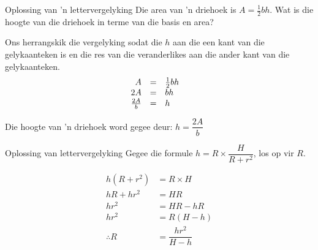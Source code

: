 
\begin{wex}
{Oplossing van 'n lettervergelyking}
{
Die area van ’n driehoek is $A=\frac{1}{2}bh$. Wat is die hoogte van die driehoek in terme van die basis en area?
}
{
Ons herrangskik die vergelyking sodat die $h$ aan die een kant
van die gelykaanteken is en die res van die veranderlikes aan die
ander kant van die gelykaanteken.
\begin{equation*}
    \begin{array}{cccc}\hfill A& =& \frac{1}{2}bh\hfill & \\
	\hfill 2A& =& bh\hfill & \hfill \\
	\hfill \frac{2A}{b}& =& h\hfill 
    \end{array}
\end{equation*}

Die hoogte van ’n driehoek word gegee deur: $h=\dfrac{2A}{b}$
} 
\end{wex}

\begin{wex}
{Oplossing van lettervergelyking}
{
Gegee die formule $h=  R\times \dfrac{H}{R+r^2}$, los op vir $R$.
}
{
\begin{align*}
  h(R+r^2) &= R \times H \\
  hR + hr^2 &= HR \\
  hr^2 &= HR - hR \\
  hr^2 &= R(H - h) \\
  \therefore R &= \dfrac{hr^2}{H-h}
\end{align*}


} 
\end{wex}

